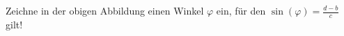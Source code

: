 \begin{beispiel}[AG 4.1]{1}
Zeichne in der obigen Abbildung einen Winkel $\varphi$ ein, für den $\sin(\varphi)=\frac{d-b}{c}$ gilt!

\end{beispiel}